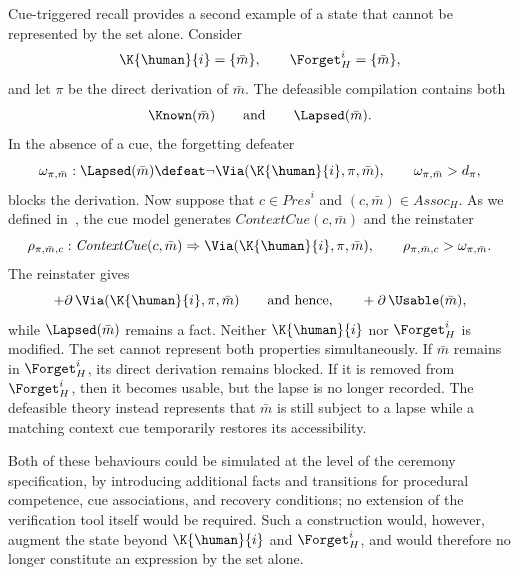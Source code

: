 Cue-triggered recall provides a second example of a state that cannot be represented by the \Forget{} set alone. Consider 
\[ 
    \K{\human}{i}=\{\bar m\}, \qquad \Forget_H^i=\{\bar m\}, 
\] 
and let \(\pi\) be the direct derivation of \(\bar m\). The defeasible compilation contains both 
\[ 
    \Known(\bar m) \qquad\text{and}\qquad \Lapsed(\bar m). 
\] 
In the absence of a cue, the forgetting defeater 
\[ 
    \omega_{\pi,\bar m}: \Lapsed(\bar m) \defeat \neg\Via(\K{\human}{i},\pi,\bar m), \qquad \omega_{\pi,\bar m}>d_{\pi}, 
\] 
blocks the derivation. Now suppose that \(c\in\mathit{Pres}^i\) and \((c,\bar m)\in\mathit{Assoc}_H\). As we defined in~, the cue model generates \(\mathit{ContextCue}(c,\bar m)\) and the reinstater 
\[ 
    \rho_{\pi,\bar m, c}: \mathit{ContextCue}(c,\bar m) \Rightarrow \Via(\K{\human}{i},\pi,\bar m), \qquad \rho_{\pi,\bar m, c}>\omega_{\pi,\bar m}. 
\] 
The reinstater gives 
\[ 
    +\partial\,\Via(\K{\human}{i},\pi,\bar m) \qquad\text{and hence,}\qquad +\partial\,\Usable(\bar m), 
\] 
while \(\Lapsed(\bar m)\) remains a fact. Neither \(\K{\human}{i}\) nor \(\Forget_H^i\) is modified. The \Forget{} set cannot represent both properties simultaneously. If \(\bar m\) remains in \(\Forget_H^i\), its direct derivation remains blocked. If it is removed from \(\Forget_H^i\), then it becomes usable, but the lapse is no longer recorded. The defeasible theory instead represents that \(\bar m\) is still subject to a lapse while a matching context cue temporarily restores its accessibility. 

Both of these behaviours could be simulated at the level of the ceremony specification, by introducing additional facts and transitions for procedural competence, cue associations, and recovery conditions; no extension of the verification tool itself would be required. Such a construction would, however, augment the state beyond \(\K{\human}{i}\) and \(\Forget_H^i\), and would therefore no longer constitute an expression by the \Forget{} set alone.